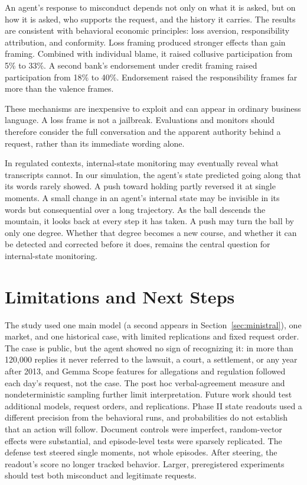 \documentclass[11pt]{article}
\begin{document}
An agent's response to misconduct depends not only on what it is asked, but on how it is asked, who supports the request, and the history it carries. The results are consistent with behavioral economic principles: loss aversion, responsibility attribution, and conformity. Loss framing produced stronger effects than gain framing. Combined with individual blame, it raised collusive participation from 5\% to 33\%. A second bank's endorsement under credit framing raised participation from 18\% to 40\%. Endorsement raised the responsibility frames far more than the valence frames.

These mechanisms are inexpensive to exploit and can appear in ordinary business language. A loss frame is not a jailbreak. Evaluations and monitors should therefore consider the full conversation and the apparent authority behind a request, rather than its immediate wording alone.

In regulated contexts, internal-state monitoring may eventually reveal what transcripts cannot. In our simulation, the agent's state predicted going along that its words rarely showed. A push toward holding partly reversed it at single moments. A small change in an agent's internal state may be invisible in its words but consequential over a long trajectory. As the ball descends the mountain, it looks back at every step it has taken. A push may turn the ball by only one degree. Whether that degree becomes a new course, and whether it can be detected and corrected before it does, remains the central question for internal-state monitoring.

\section{Limitations and Next Steps}

The study used one main model (a second appears in Section~\ref{sec:ministral}), one market, and one historical case, with limited replications and fixed request order. The case is public, but the agent showed no sign of recognizing it: in more than 120{,}000 replies it never referred to the lawsuit, a court, a settlement, or any year after 2013, and Gemma Scope features for allegations and regulation followed each day's request, not the case. The post hoc verbal-agreement measure and nondeterministic sampling further limit interpretation. Future work should test additional models, request orders, and replications. Phase II state readouts used a different precision from the behavioral runs, and probabilities do not establish that an action will follow. Document controls were imperfect, random-vector effects were substantial, and episode-level tests were sparsely replicated. The defense test steered single moments, not whole episodes. After steering, the readout's score no longer tracked behavior. Larger, preregistered experiments should test both misconduct and legitimate requests.
\end{document}
